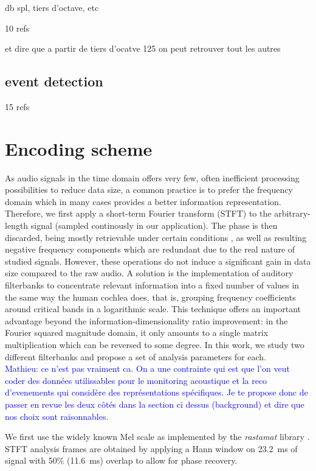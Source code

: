 \documentclass[final,3p,times,twocolumn]{elsarticle}
\newcommand{\ml}[1]{\textcolor{blue}{ Mathieu: #1}}
\begin{document}
db spl, tiers d'octave, etc

10 refs

et dire que a partir de tiers d'ocatve 125 on peut retrouver tout les autres

\subsection{event detection}

15 refs

\section{Encoding scheme}

As audio signals in the time domain offers very few, often inefficient processing possibilities to reduce data size, a common practice is to prefer the frequency domain which in many cases provides a better information representation. Therefore, we first apply a short-term Fourier transform (STFT) to the arbitrary-length signal (sampled continously in our application). The phase is then discarded, being mostly retrievable under certain conditions \cite{nawab1983}, as well as resulting negative frequency components which are redundant due to the real nature of studied signals. However, these operations do not induce a significant gain in data size compared to the raw audio. A solution is the implementation of auditory filterbanks to concentrate relevant information into a fixed number of values in the same way the human cochlea does, that is, grouping frequency coefficients around critical bands in a logarithmic scale. This technique offers an important advantage beyond the information-dimensionality ratio improvement: in the Fourier squared magnitude domain, it only amounts to a single matrix multiplication which can be reversed to some degree. In this work, we study two different filterbanks and propose a set of analysis parameters for each.\\

\ml{ce n'est pas vraiment ca. On a une contrainte qui est que l'on veut coder des données utilissables pour le monitoring acoustique et la reco d'evenements qui considère des représentations spécifiques. Je te propose donc de passer en revue les deux côtés dans la section ci dessus (background) et dire que nos choix sont raisonnables.}

We first use the widely known Mel scale as implemented by the \textit{rastamat} library \cite{ellis2005}. STFT analysis frames are obtained by applying a Hann window on 23.2~ms of signal with 50\% (11.6~ms) overlap to allow for phase recovery.\\
\end{document}
